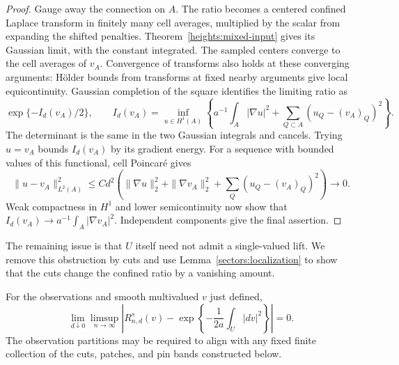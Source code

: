 \begin{proof}
Gauge away the connection on \(A\). The ratio becomes a centered
confined Laplace transform in finitely many cell averages, multiplied
by the scalar from expanding the shifted penalties.
Theorem~\ref{heights:mixed-input} gives its Gaussian limit, with the
constant integrated. The sampled centers converge to the cell
averages of \(v_A\). Convergence of transforms also holds at these
converging arguments: H\"older bounds from transforms at fixed nearby
arguments give local equicontinuity.
Gaussian completion of the square identifies the limiting ratio as
\[
 \exp\{-I_d(v_A)/2\},\qquad
 I_d(v_A)=\inf_{u\in H^1(A)}
 \left\{a^{-1}\int_A|\nabla u|^2+
          \sum_{Q\subset A}(u_Q-(v_A)_Q)^2\right\}.
\]
The determinant is the same in the two Gaussian integrals and cancels.
Trying \(u=v_A\) bounds \(I_d(v_A)\) by its gradient energy.
For a sequence with bounded values of this functional, cell Poincar\'e
gives
\[
 \|u-v_A\|_{L^2(A)}^2
 \le C d^2\left(\|\nabla u\|_2^2+\|\nabla v_A\|_2^2+
                       \sum_Q(u_Q-(v_A)_Q)^2\right)\longrightarrow0.
\]
Weak compactness in \(H^1\) and lower semicontinuity now show that
\(I_d(v_A)\to a^{-1}\int_A|\nabla v_A|^2\).
Independent components give the final assertion.
\end{proof}

The remaining issue is that \(U\) itself need not admit a
single-valued lift. We remove this obstruction by cuts and use
Lemma~\ref{sectors:localization} to show that the cuts change the
confined ratio by a vanishing amount.

\begin{proposition}\label{sectors:weighted}
For the observations and smooth multivalued \(v\) just defined,
\begin{equation}
 \lim_{d\downarrow0}\limsup_{n\to\infty}
 \left|R_{n,d}^s(v)-
       \exp\left\{-\frac1{2a}\int_U|dv|^2\right\}\right|=0.
 \tag{5}\label{eq:source-5}
\end{equation}
The observation partitions may be required to align with any fixed
finite collection of the cuts, patches, and pin bands constructed
below.
\end{proposition}

